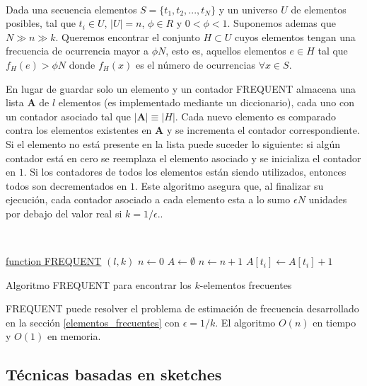 \documentclass[a4paper,10pt, oneside]{article}
\begin{document}
\

Dada una secuencia elementos $S = \{t_1, t_2, ..., t_N\}$ y un universo $U$ de elementos posibles, tal que $t_i \in U$, $|U| = n$, $\phi \in R$ y $0 < \phi < 1$. Suponemos ademas que $N \gg n \gg k$. Queremos encontrar el conjunto $H \subset U$ cuyos elementos tengan una frecuencia de ocurrencia mayor a $\phi N$, esto es, aquellos elementos $e \in H$ tal que $f_H(e) > \phi N$ donde $f_H(x)$ es el número de ocurrencias $\forall x \in S$. 

En lugar de guardar solo un elemento y un contador FREQUENT almacena una lista $\mathbf{A}$ de $l$ elementos (es implementado mediante un diccionario), cada uno con un contador asociado tal que $|\mathbf{A}| \equiv |H|$. Cada nuevo elemento es comparado contra los elementos existentes en $\mathbf{A}$ y se incrementa el contador correspondiente. Si el elemento no está presente en la lista puede suceder lo siguiente: si algún contador está en cero se reemplaza el elemento asociado y se inicializa el contador en $1$. Si los contadores de todos los elementos están siendo utilizados, entonces todos son decrementados en $1$. Este algoritmo asegura que, al finalizar su ejecución, cada contador asociado a cada elemento esta a lo sumo $\epsilon N$ unidades por debajo del valor real si $k = 1/ \epsilon$.\cite{Kranakis03boundsfor}.


\

\begin{algorithm}
	
	\underline{function FREQUENT} $(l, k)$\;
	$n \leftarrow 0$\;
	$A \leftarrow \emptyset$\;
	{
		$n \leftarrow n + 1$\;
		{
			$A[t_i] \leftarrow A[t_i] + 1$\;
		}{
		}
	}
	\caption{Algoritmo FREQUENT para encontrar los $k$-elementos frecuentes}
	\label{alg:frequent}
\end{algorithm}

FREQUENT puede resolver el problema de estimación de frecuencia desarrollado en la sección \ref{elementos_frecuentes} con $\epsilon = 1/k$. El algoritmo $O(n)$ en tiempo y $O(1)$ en memoria.

\subsection{Técnicas basadas en sketches}
\end{document}
